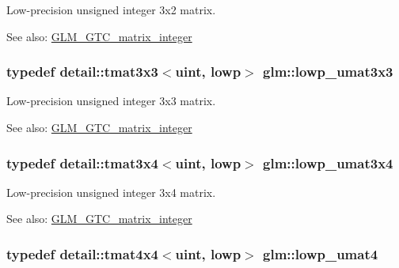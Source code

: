 Low-precision unsigned integer 3x2 matrix. \begin{Desc}
\item[See also:]\hyperlink{group__gtc__matrix__integer}{GLM\_\-GTC\_\-matrix\_\-integer} \end{Desc}
\hypertarget{group__gtc__matrix__integer_g691694b1a4c6d1e613d8f1f707acc829}{
\subsubsection[lowp\_\-umat3x3]{\setlength{\rightskip}{0pt plus 5cm}typedef detail::tmat3x3$<$uint, lowp$>$ {\bf glm::lowp\_\-umat3x3}}}
\label{group__gtc__matrix__integer_g691694b1a4c6d1e613d8f1f707acc829}


Low-precision unsigned integer 3x3 matrix. \begin{Desc}
\item[See also:]\hyperlink{group__gtc__matrix__integer}{GLM\_\-GTC\_\-matrix\_\-integer} \end{Desc}
\hypertarget{group__gtc__matrix__integer_gd44577fcaebad47da39cc244566d7fe3}{
\subsubsection[lowp\_\-umat3x4]{\setlength{\rightskip}{0pt plus 5cm}typedef detail::tmat3x4$<$uint, lowp$>$ {\bf glm::lowp\_\-umat3x4}}}
\label{group__gtc__matrix__integer_gd44577fcaebad47da39cc244566d7fe3}


Low-precision unsigned integer 3x4 matrix. \begin{Desc}
\item[See also:]\hyperlink{group__gtc__matrix__integer}{GLM\_\-GTC\_\-matrix\_\-integer} \end{Desc}
\hypertarget{group__gtc__matrix__integer_g571dcc0328ddd1d8c54eba047b5bfa2f}{
\subsubsection[lowp\_\-umat4]{\setlength{\rightskip}{0pt plus 5cm}typedef detail::tmat4x4$<$uint, lowp$>$ {\bf glm::lowp\_\-umat4}}}
\label{group__gtc__matrix__integer_g571dcc0328ddd1d8c54eba047b5bfa2f}


